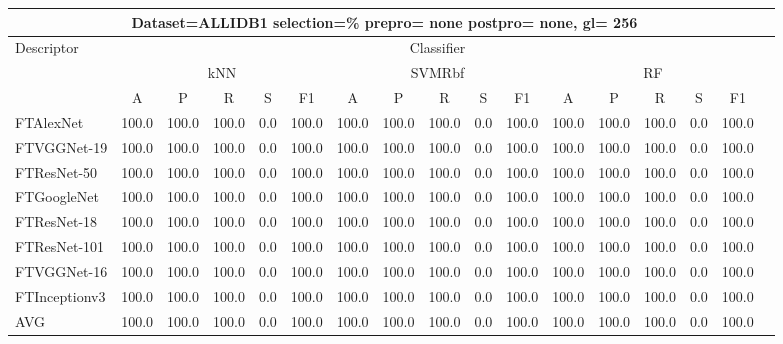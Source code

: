 \documentclass[12pt,italian]{article}
\begin{document}
\begin{tiny}
 \pagebreak 
\begin{longtable}{lcccccccccccccccc}
\toprule
\multicolumn{16}{c}{Dataset=ALLIDB1 selection=\% prepro= none postpro= none, gl= 256} \\ 
\toprule
Descriptor & \multicolumn{15}{c}{Classifier} \\ 
& \multicolumn{5}{c}{kNN} & \multicolumn{5}{c}{SVMRbf} & \multicolumn{5}{c}{RF} \\ 
& A & P & R & S & F1 & A & P & R & S & F1 & A & P & R & S & F1 \\ 
\midrule
FTAlexNet & 100.0 & 100.0 & 100.0 &  0.0 & 100.0 & 100.0 & 100.0 & 100.0 &  0.0 & 100.0 & 100.0 & 100.0 & 100.0 &  0.0 & 100.0 \\ 
FTVGGNet-19 & 100.0 & 100.0 & 100.0 &  0.0 & 100.0 & 100.0 & 100.0 & 100.0 &  0.0 & 100.0 & 100.0 & 100.0 & 100.0 &  0.0 & 100.0 \\ 
FTResNet-50 & 100.0 & 100.0 & 100.0 &  0.0 & 100.0 & 100.0 & 100.0 & 100.0 &  0.0 & 100.0 & 100.0 & 100.0 & 100.0 &  0.0 & 100.0 \\ 
FTGoogleNet & 100.0 & 100.0 & 100.0 &  0.0 & 100.0 & 100.0 & 100.0 & 100.0 &  0.0 & 100.0 & 100.0 & 100.0 & 100.0 &  0.0 & 100.0 \\ 
FTResNet-18 & 100.0 & 100.0 & 100.0 &  0.0 & 100.0 & 100.0 & 100.0 & 100.0 &  0.0 & 100.0 & 100.0 & 100.0 & 100.0 &  0.0 & 100.0 \\ 
FTResNet-101 & 100.0 & 100.0 & 100.0 &  0.0 & 100.0 & 100.0 & 100.0 & 100.0 &  0.0 & 100.0 & 100.0 & 100.0 & 100.0 &  0.0 & 100.0 \\ 
FTVGGNet-16 & 100.0 & 100.0 & 100.0 &  0.0 & 100.0 & 100.0 & 100.0 & 100.0 &  0.0 & 100.0 & 100.0 & 100.0 & 100.0 &  0.0 & 100.0 \\ 
FTInceptionv3 & 100.0 & 100.0 & 100.0 &  0.0 & 100.0 & 100.0 & 100.0 & 100.0 &  0.0 & 100.0 & 100.0 & 100.0 & 100.0 &  0.0 & 100.0 \\ 
\hline
AVG & 100.0 & 100.0 & 100.0 &  0.0 & 100.0 & 100.0 & 100.0 & 100.0 &  0.0 & 100.0 & 100.0 & 100.0 & 100.0 &  0.0 & 100.0 \\ 
\hline
\bottomrule
\end{longtable} 

 \pagebreak 
\end{tiny} 
 
\end{document}
